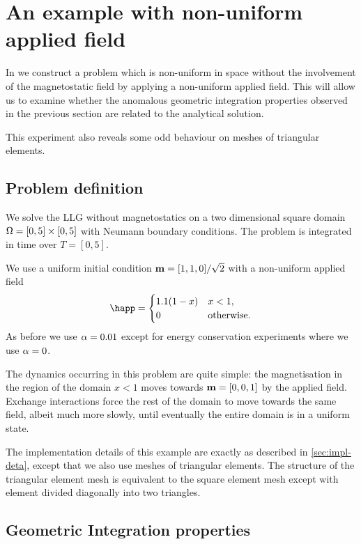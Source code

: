\FloatBarrier
\section{An example with non-uniform applied field}
\label{sec:non-uniform-applied}

In  we construct a problem which is non-uniform in space without the involvement of the magnetostatic field by applying a non-uniform applied field.
This will allow us to examine whether the anomalous geometric integration properties observed in the previous section are related to the analytical solution.

This experiment also reveals some odd behaviour on meshes of triangular elements.

\subsection{Problem definition}

We solve the LLG without magnetostatics on a two dimensional square domain $\Omega = [0,5] \times [0,5]$ with Neumann boundary conditions.
The problem is integrated in time over $T = [0, 5]$.

We use a uniform initial condition $\boldsymbol{\mathrm{m}} = [1, 1, 0]/\sqrt{2}$ with a non-uniform applied field
\begin{equation}
  \happ =
  \begin{cases}
    1.1 (1 -  x) & x  < 1, \\
    0 & \mathrm{otherwise}.
  \end{cases}
\end{equation}
As before we use $\alpha = 0.01$ except for energy conservation experiments where we use $\alpha = 0$.

The dynamics occurring in this problem are quite simple: the magnetisation in the region of the domain $x<1$ moves towards $\boldsymbol{\mathrm{m}} = [0, 0, 1]$ by the applied field.
Exchange interactions force the rest of the domain to move towards the same field, albeit much more slowly, until eventually the entire domain is in a uniform state.

The implementation details of this example are exactly as described in \cref{sec:impl-deta}, except that we also use meshes of triangular elements.
The structure of the triangular element mesh is equivalent to the square element mesh except with element divided diagonally into two triangles.


\subsection{Geometric Integration properties}


